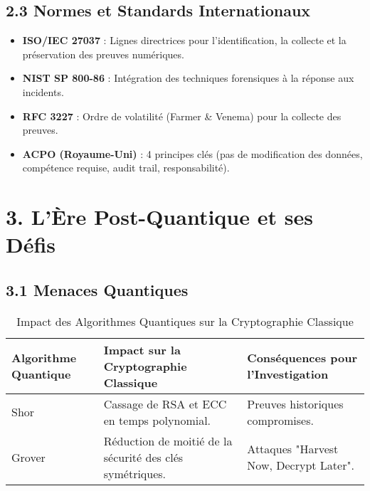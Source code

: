 \documentclass[12pt, a4paper]{report}
\begin{document}
\subsection*{2.3 Normes et Standards Internationaux}
\begin{itemize}
    \item \textbf{ISO/IEC 27037} : Lignes directrices pour l’identification, la collecte et la préservation des preuves numériques.
    \item \textbf{NIST SP 800-86} : Intégration des techniques forensiques à la réponse aux incidents.
    \item \textbf{RFC 3227} : Ordre de volatilité (Farmer \& Venema) pour la collecte des preuves.
    \item \textbf{ACPO (Royaume-Uni)} : 4 principes clés (pas de modification des données, compétence requise, audit trail, responsabilité).
\end{itemize}

\section*{3. L’Ère Post-Quantique et ses Défis}
\subsection*{3.1 Menaces Quantiques}
\begin{table}[h]
    \centering
    \caption{Impact des Algorithmes Quantiques sur la Cryptographie Classique}
    \begin{tabularx}{\textwidth}{|l|X|X|}
        \hline
        \textbf{Algorithme Quantique} & \textbf{Impact sur la Cryptographie Classique} & \textbf{Conséquences pour l’Investigation} \\ \hline
        Shor & Cassage de RSA et ECC en temps polynomial. & Preuves historiques compromises. \\ \hline
        Grover & Réduction de moitié de la sécurité des clés symétriques. & Attaques "Harvest Now, Decrypt Later". \\ \hline
    \end{tabularx}
\end{table}
\end{document}
